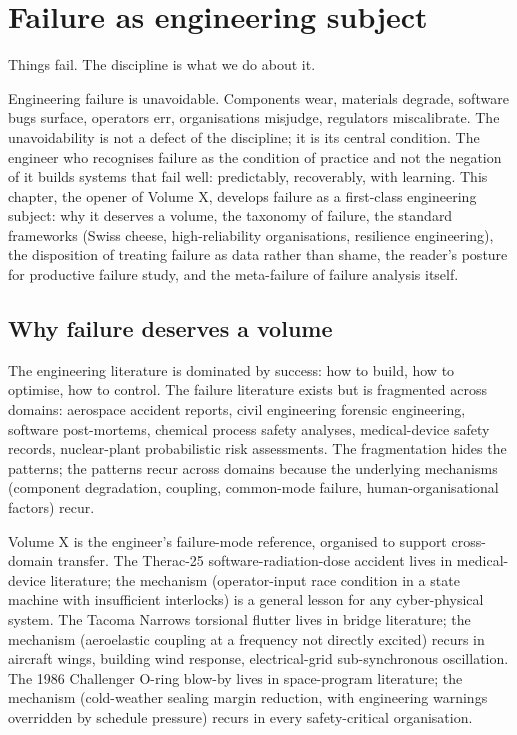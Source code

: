\chapter{Failure as engineering subject}
\label{vol10:ch01}

\epigraph{Things fail. The discipline is what we do about it.}{}


\noindent
Engineering failure is unavoidable. Components wear, materials degrade, software bugs surface, operators err, organisations misjudge, regulators miscalibrate. The unavoidability is not a defect of the discipline; it is its central condition. The engineer who recognises failure as the condition of practice and not the negation of it builds systems that fail well: predictably, recoverably, with learning. This chapter, the opener of Volume X, develops failure as a first-class engineering subject: why it deserves a volume, the taxonomy of failure, the standard frameworks (Swiss cheese, high-reliability organisations, resilience engineering), the disposition of treating failure as data rather than shame, the reader's posture for productive failure study, and the meta-failure of failure analysis itself.

\section{Why failure deserves a volume}

The engineering literature is dominated by success: how to build, how to optimise, how to control. The failure literature exists but is fragmented across domains: aerospace accident reports, civil engineering forensic engineering, software post-mortems, chemical process safety analyses, medical-device safety records, nuclear-plant probabilistic risk assessments. The fragmentation hides the patterns; the patterns recur across domains because the underlying mechanisms (component degradation, coupling, common-mode failure, human-organisational factors) recur.

Volume X is the engineer's failure-mode reference, organised to support cross-domain transfer. The Therac-25 software-radiation-dose accident lives in medical-device literature; the mechanism (operator-input race condition in a state machine with insufficient interlocks) is a general lesson for any cyber-physical system. The Tacoma Narrows torsional flutter lives in bridge literature; the mechanism (aeroelastic coupling at a frequency not directly excited) recurs in aircraft wings, building wind response, electrical-grid sub-synchronous oscillation. The 1986 Challenger O-ring blow-by lives in space-program literature; the mechanism (cold-weather sealing margin reduction, with engineering warnings overridden by schedule pressure) recurs in every safety-critical organisation.

